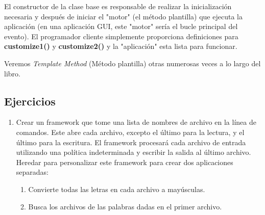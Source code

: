El constructor de la clase base es responsable de realizar la inicialización necesaria y después de iniciar el "motor" (el método plantilla) que ejecuta la aplicación (en una aplicación GUI, este "motor" sería el
bucle principal del evento). El programador cliente simplemente proporciona definiciones para \textbf{customize1()}  y \textbf{customize2()} y la "aplicación" esta lista para funcionar.     \newline

Veremos \textit{Template Method} (Método plantilla) otras numerosas veces a lo largo del libro.

\subsection*{Ejercicios}
\label{subsec:exercises}


\begin{enumerate}[1.]
    \item Crear un framework que tome una lista de nombres de archivo en la línea de comandos. Este abre cada archivo, excepto el último para la lectura, y el último para la escritura. El framework procesará cada archivo de entrada utilizando una política indeterminada y escribir la salida al último archivo. Heredar para personalizar este framework para crear dos aplicaciones separadas:
    \begin{enumerate}[1)]
        \item Convierte todas las letras en cada archivo a mayúsculas.
        \item Busca los archivos de las palabras dadas en el primer archivo.
    \end{enumerate}
\end{enumerate}
